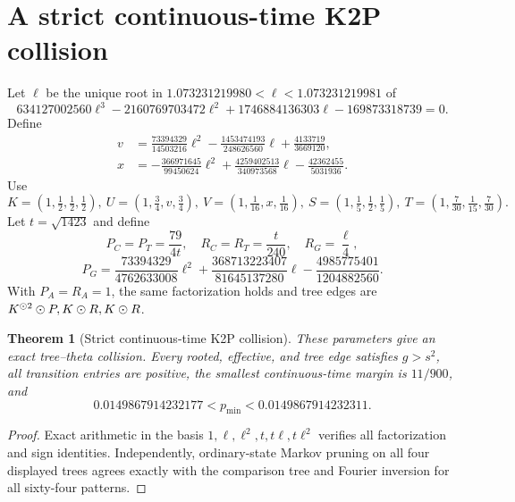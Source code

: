 \documentclass[11pt]{article}
\newtheorem{theorem}{Theorem}\newtheorem{proposition}[theorem]{Proposition}\newtheorem{lemma}[theorem]{Lemma}\newtheorem{corollary}[theorem]{Corollary}
\theoremstyle{remark}\newtheorem{remark}[theorem]{Remark}
\begin{document}
\section{A strict continuous-time K2P collision}\label{sec:k2p-ct}
Let $\ell$ be the unique root in $1.073231219980<\ell<1.073231219981$ of
\begin{equation}\label{eq:ell}634127002560\ell^3-2160769703472\ell^2+1746884136303\ell-169873318739=0.\end{equation}
Define
\begin{align*}
v&=\frac{73394329}{14503216}\ell^2-\frac{1453474193}{248626560}\ell+\frac{4133719}{3669120},\\
x&=-\frac{366971645}{99450624}\ell^2+\frac{4259402513}{340973568}\ell-\frac{42362455}{5031936}.
\end{align*}
Use
\begin{equation}\label{eq:k2p-ct-vectors}
K=(1,\tfrac12,\tfrac12,\tfrac12),\ U=(1,\tfrac34,v,\tfrac34),\ V=(1,\tfrac1{16},x,\tfrac1{16}),\ S=(1,\tfrac15,\tfrac12,\tfrac15),\ T=(1,\tfrac7{30},\tfrac1{15},\tfrac7{30}).
\end{equation}
Let $t=\sqrt{1423}$ and define
\[
P_C=P_T=\frac{79}{4t},\quad R_C=R_T=\frac{t}{240},\quad R_G=\frac\ell4,
\]
\[
P_G=\frac{73394329}{4762633008}\ell^2+\frac{368713223407}{81645137280}\ell-\frac{4985775401}{1204882560}.
\]
With $P_A=R_A=1$, the same factorization holds and tree edges are $K^{\mathbin{\odot}2}\mathbin{\odot} P,K\mathbin{\odot} R,K\mathbin{\odot} R$.
\begin{theorem}[Strict continuous-time K2P collision]\label{thm:k2p-ct}
These parameters give an exact tree--theta collision. Every rooted, effective, and tree edge satisfies $g>s^2$, all transition entries are positive, the smallest continuous-time margin is $11/900$, and
\[
0.0149867914232177<p_{\min}<0.0149867914232311.
\]
\end{theorem}
\begin{proof}
Exact arithmetic in the basis $1,\ell,\ell^2,t,t\ell,t\ell^2$ verifies all factorization and sign identities. Independently, ordinary-state Markov pruning on all four displayed trees agrees exactly with the comparison tree and Fourier inversion for all sixty-four patterns.
\end{proof}
\end{document}
